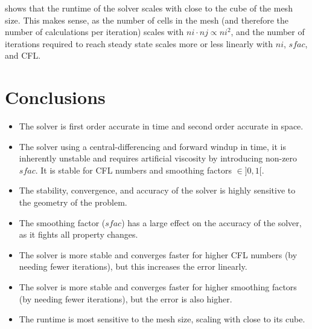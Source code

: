 \documentclass[twocolumn]{article}
\begin{document}
 shows that the runtime of the solver scales with close to the cube of the mesh size.
This makes sense, as the number of cells in the mesh (and therefore the number of calculations per iteration) scales with $ni \cdot nj \propto ni^2$,
and the number of iterations required to reach steady state scales more or less linearly with $ni$, $sfac$, and CFL.

\section{Conclusions}

\begin{itemize}
    \item The solver is first order accurate in time and second order accurate in space.
    \item The solver using a central-differencing and forward windup in time,
    it is inherently unstable and requires artificial viscosity by introducing non-zero $sfac$. It is stable for CFL numbers and smoothing factors $\in ]0,1[$.
    \item The stability, convergence, and accuracy of the solver is highly sensitive to the geometry of the problem.
    \item The smoothing factor ($sfac$) has a large effect on the accuracy of the solver, as it fights all property changes.
    \item The solver is more stable and converges faster for higher CFL numbers (by needing fewer iterations), but this increases the error linearly.
    \item The solver is more stable and converges faster for higher smoothing factors (by needing fewer iterations), but the error is also higher.
    \item The runtime is most sensitive to the mesh size, scaling with close to its cube.
\end{itemize}
\end{document}

